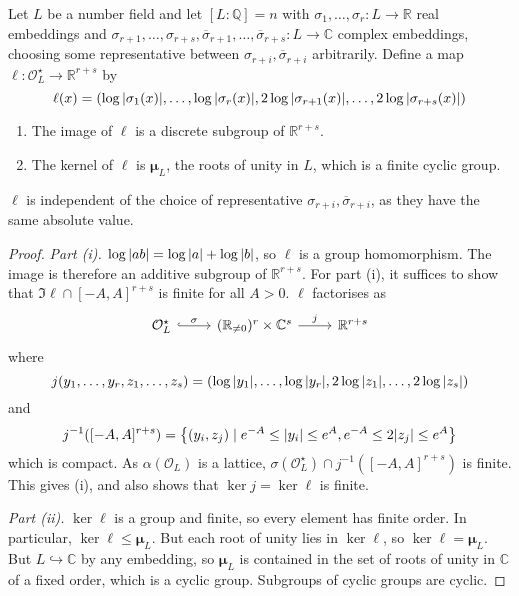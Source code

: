 Let \( L \) be a number field and let \( [L:\mathbb Q] = n \) with \( \sigma_1, \dots, \sigma_r \colon L \to \mathbb R \) real embeddings and \( \sigma_{r+1}, \dots, \sigma_{r+s}, \overline\sigma_{r+1}, \dots, \overline\sigma_{r+s} \colon L \to \mathbb C \) complex embeddings, choosing some representative between \( \sigma_{r+i}, \overline \sigma_{r+i} \) arbitrarily.
Define a map \( \ell \colon \mathcal O_L^\star \to \mathbb R^{r+s} \) by
\[ \ell(x) = (\log \abs{\sigma_1(x)}, \dots, \log\abs{\sigma_r(x)}, 2\log\abs{\sigma_{r+1}(x)}, \dots, 2\log\abs{\sigma_{r+s}(x)}) \]
\begin{lemma}
    \begin{enumerate}
        \item The image of \( \ell \) is a discrete subgroup of \( \mathbb R^{r+s} \).
        \item The kernel of \( \ell \) is \( \bm \mu_L \), the roots of unity in \( L \), which is a finite cyclic group.
    \end{enumerate}
\end{lemma}
\begin{remark}
    \( \ell \) is independent of the choice of representative \( \sigma_{r+i}, \overline\sigma_{r+i} \), as they have the same absolute value.
\end{remark}
\begin{proof}
    \emph{Part (i).}
    \( \log \abs{ab} = \log \abs{a} + \log \abs{b} \), so \( \ell \) is a group homomorphism.
    The image is therefore an additive subgroup of \( \mathbb R^{r+s} \).
    For part (i), it suffices to show that \( \Im \ell \cap [-A,A]^{r+s} \) is finite for all \( A > 0 \).
    \( \ell \) factorises as
    \[\begin{tikzcd}
        {\mathcal O_L^\star} & {(\mathbb R_{\neq 0})^r \times \mathbb C^s} & {\mathbb R^{r+s}}
        \arrow["\sigma", hook, from=1-1, to=1-2]
        \arrow["j", from=1-2, to=1-3]
    \end{tikzcd}\]
    where
    \[ j(y_1, \dots, y_r, z_1, \dots, z_s) = (\log \abs{y_1}, \dots, \log \abs{y_r}, 2\log\abs{z_1}, \dots, 2\log \abs{z_s}) \]
    and
    \[ j^{-1}([-A,A]^{r+s}) = \qty{(y_i, z_j) \mid e^{-A} \leq \abs{y_i} \leq e^A, e^{-A} \leq 2\abs{z_j} \leq e^A} \]
    which is compact.
    As \( \alpha(\mathcal O_L) \) is a lattice, \( \sigma(\mathcal O_L^\star) \cap j^{-1}([-A,A]^{r+s}) \) is finite.
    This gives (i), and also shows that \( \ker j = \ker \ell \) is finite.

    \emph{Part (ii).}
    \( \ker \ell \) is a group and finite, so every element has finite order.
    In particular, \( \ker \ell \leq \bm \mu_L \).
    But each root of unity lies in \( \ker \ell \), so \( \ker \ell = \bm\mu_L \).
    But \( L \hookrightarrow \mathbb C \) by any embedding, so \( \bm\mu_L \) is contained in the set of roots of unity in \( \mathbb C \) of a fixed order, which is a cyclic group.
    Subgroups of cyclic groups are cyclic.
\end{proof}
